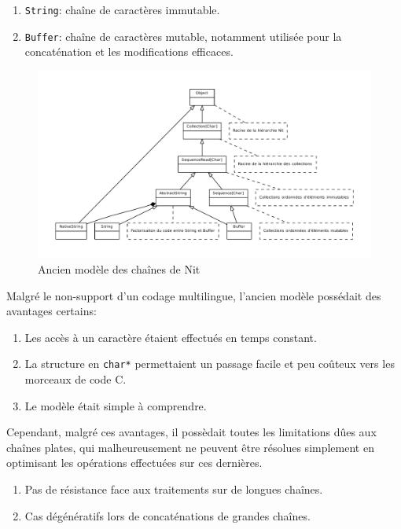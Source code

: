 \begin{enumerate}
	\item\texttt{String}: chaîne de caractères immutable.
	\item\texttt{Buffer}: chaîne de caractères mutable, notamment utilisée pour la concaténation et les modifications efficaces.
\end{enumerate}

\begin{figure}
	\caption{Ancien mod\`{e}le des chaînes de Nit}
	\label{oldmodel}
	\centering
	\includegraphics[angle=90, scale=0.75]{figures/old_model.pdf}
\end{figure}

Malgré le non-support d'un codage multilingue, l'ancien modèle possédait des avantages certains:

\begin{enumerate}
	\item Les accès à un caractère étaient effectués en temps constant.
	\item La structure en \texttt{char*} permettaient un passage facile et peu coûteux vers les morceaux de code C.
	\item Le modèle était simple à comprendre.
\end{enumerate}

Cependant, malgré ces avantages, il possèdait toutes les limitations dûes aux chaînes plates,
qui malheureusement ne peuvent être résolues simplement en optimisant les opérations effectuées sur ces
dernières.

\begin{enumerate}
	\item Pas de résistance face aux traitements sur de longues chaînes.
	\item Cas dégénératifs lors de concaténations de grandes chaînes.
\end{enumerate}

